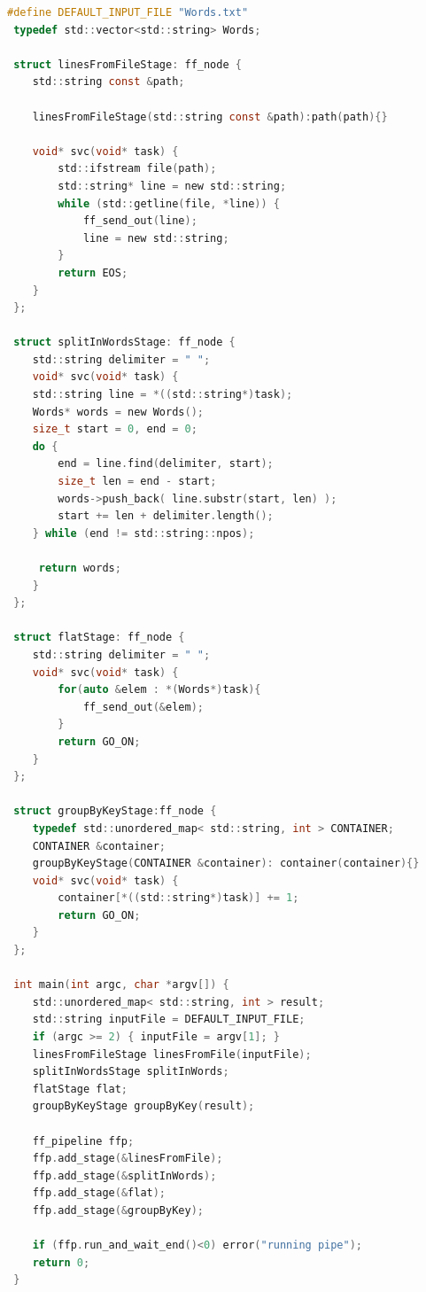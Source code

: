 


\begin{lstlisting}[language=c, frame=single, caption={Le code source FastFlow d'une application de d\'ecompte du nombre d'occurrences des mots.},captionpos=b]
 #define DEFAULT_INPUT_FILE "Words.txt"
 typedef std::vector<std::string> Words;
 
 struct linesFromFileStage: ff_node {
 	std::string const &path;
 
 	linesFromFileStage(std::string const &path):path(path){}
 
	void* svc(void* task) {
		std::ifstream file(path);
		std::string* line = new std::string;
		while (std::getline(file, *line)) {
			ff_send_out(line);
			line = new std::string;
		}
		return EOS;
	}
 };
 
 struct splitInWordsStage: ff_node {
	std::string delimiter = " ";
	void* svc(void* task) {
	std::string line = *((std::string*)task);
	Words* words = new Words();
	size_t start = 0, end = 0;
	do {
		end = line.find(delimiter, start);
		size_t len = end - start;
		words->push_back( line.substr(start, len) );
		start += len + delimiter.length();
	} while (end != std::string::npos);

	 return words;
	}
 };
 
 struct flatStage: ff_node {
    std::string delimiter = " ";
 	void* svc(void* task) {
 	    for(auto &elem : *(Words*)task){
 	    	ff_send_out(&elem);
 	    }
 		return GO_ON;
 	}
 };
 
 struct groupByKeyStage:ff_node {
 	typedef std::unordered_map< std::string, int > CONTAINER;
 	CONTAINER &container;
 	groupByKeyStage(CONTAINER &container): container(container){}
 	void* svc(void* task) {
 		container[*((std::string*)task)] += 1;
 		return GO_ON;
    }
 };
 
 int main(int argc, char *argv[]) {
 	std::unordered_map< std::string, int > result;
 	std::string inputFile = DEFAULT_INPUT_FILE;
	if (argc >= 2) { inputFile = argv[1]; } 
	linesFromFileStage linesFromFile(inputFile);
	splitInWordsStage splitInWords;
	flatStage flat;
	groupByKeyStage groupByKey(result);

	ff_pipeline ffp;
	ffp.add_stage(&linesFromFile);
	ffp.add_stage(&splitInWords);
	ffp.add_stage(&flat);
	ffp.add_stage(&groupByKey);

	if (ffp.run_and_wait_end()<0) error("running pipe");
 	return 0;
 }
\end{lstlisting}
\label{wordcountFastFlow}

